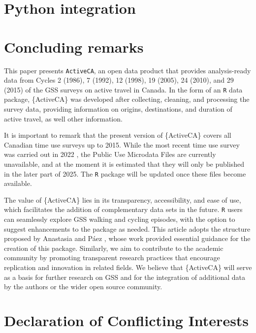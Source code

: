\documentclass[Royal,times,sageh]{sagej}
\begin{document}
\section{Python integration}\label{python-integration}

\section{Concluding remarks}\label{concluding-remarks}

This paper presents \texttt{ActiveCA}, an open data product that
provides analysis-ready data from Cycles 2 (1986), 7 (1992), 12 (1998),
19 (2005), 24 (2010), and 29 (2015) of the GSS surveys on active travel
in Canada. In the form of an \texttt{R} data package, \{ActiveCA\} was
developed after collecting, cleaning, and processing the survey data,
providing information on origins, destinations, and duration of active
travel, as well other information.

It is important to remark that the present version of \{ActiveCA\}
covers all Canadian time use surveys up to 2015. While the most recent
time use survey was carried out in 2022 \citep{wray2024}, the Public Use
Microdata Files are currently unavailable, and at the moment it is
estimated that they will only be published in the later part of 2025.
The \texttt{R} package will be updated once these files become
available.

The value of \{ActiveCA\} lies in its transparency, accessibility, and
ease of use, which facilitates the addition of complementary data sets
in the future. \texttt{R} users can seamlessly explore GSS walking and
cycling episodes, with the option to suggest enhancements to the package
as needed. This article adopts the structure proposed by Anastasia and
Páez \citeyearpar{soukhov2023}, whose work provided essential guidance
for the creation of this package. Similarly, we aim to contribute to the
academic community by promoting transparent research practices that
encourage replication and innovation in related fields. We believe that
\{ActiveCA\} will serve as a basis for further research on GSS and for
the integration of additional data by the authors or the wider open
source community.

\section{Declaration of Conflicting
Interests}\label{declaration-of-conflicting-interests}
\end{document}
